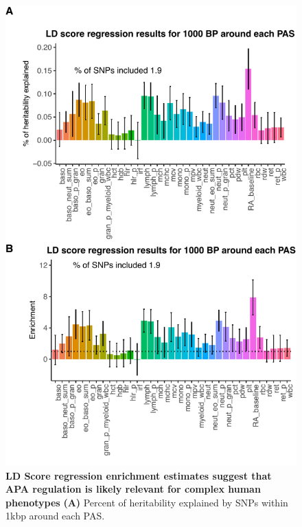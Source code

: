 \begin{figure}[!htb]
\centering
\includegraphics[width=5in]{img/ch02/Fig4_figuresupplement3.pdf}
\caption[LD Score regression enrichment estimates suggest that APA regulation is likely relevant for complex human phenotypes]{\textbf{LD Score regression enrichment estimates suggest that APA regulation is likely relevant for complex human phenotypes} {\bf (A)} Percent of heritability explained by SNPs within 1kbp around each PAS.}
\label{fig:ldregress}
\end{figure}


\begin{figure}[!htb]
\label{fig:ldregress}
\end{figure}
\clearpage

